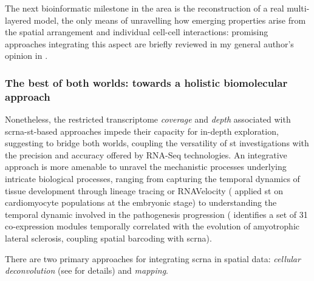 The next bioinformatic milestone in the area is the reconstruction of a real multi-layered model, the only means of unravelling how emerging properties arise from the spatial arrangement and individual cell-cell interactions: promising approaches integrating this aspect are briefly reviewed in my general author's opinion in . 

\subsubsection{The best of both worlds: towards a holistic biomolecular approach}
\label{subsec:sc-and-st}

Nonetheless, the restricted transcriptome \emph{coverage} and \emph{depth} associated with \acrshort{scrna}-\acrshort{st}-based approaches impede their capacity for in-depth exploration, suggesting to bridge both worlds, coupling the versatility of \acrshort{st} investigations with the precision and accuracy offered by \acrshort{RNA-Seq} technologies. An integrative approach is more amenable to unravel the mechanistic processes underlying intricate biological processes, ranging from capturing the temporal dynamics of tissue development through \gls{lineage tracing} \autocite{zhang_etal20} or RNAVelocity \autocite{lamanno_etal18} (\autocite{asp_etal19} applied \acrshort{st} on cardiomyocyte populations at the embryonic stage) to understanding the temporal dynamic involved in the pathogenesis progression (\autocite{maniatis_etal19} identifies a set of 31 co-expression modules temporally correlated with the evolution of amyotrophic lateral sclerosis, coupling spatial barcoding with \acrshort{scrna}). 


There are two primary approaches for integrating \acrshort{scrna} in spatial data: \emph{cellular deconvolution} (see  for details) and \emph{mapping}. 

